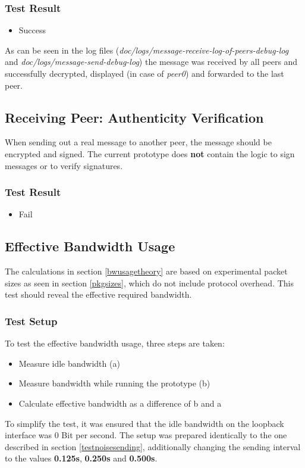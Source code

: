\subsubsection{Test Result}
\begin{itemize}
\item Success
\end{itemize}
As can be seen in the log files
(\textit{doc/logs/message-receive-log-of-peers-debug-log} and
\textit{doc/logs/message-send-debug-log})
the message was received by all peers and successfully decrypted,
displayed (in case of \textit{peer0}) and forwarded to the last
peer.
\subsection{Receiving Peer: Authenticity Verification}
When sending out a real message to another peer, the message should be
encrypted and signed. 
The current prototype does \textbf{not} contain
the logic to sign messages or to verify signatures.
\subsubsection{Test Result}
\begin{itemize}
\item Fail
\end{itemize}
\subsection{Effective Bandwidth Usage}
The calculations in section \ref{bwusagetheory} are based on experimental
packet sizes as seen in section \ref{pkgsizes}, which do not include
protocol overhead. This test should reveal the effective required
bandwidth.
\subsubsection{Test Setup}
To test the effective bandwidth usage, three steps are taken:
\begin{itemize}
\item Measure idle bandwidth (a)
\item Measure bandwidth while running the prototype (b)
\item Calculate effective bandwidth as a difference of b and a
\end{itemize}
To simplify the test, it was ensured that the idle bandwidth on the
loopback interface was 0 Bit per second.
The setup was prepared identically to the one described
in section \ref{testnoisesending}, additionally changing
the sending interval to the values \textbf{0.125s},
\textbf{0.250s} and \textbf{0.500s}.
